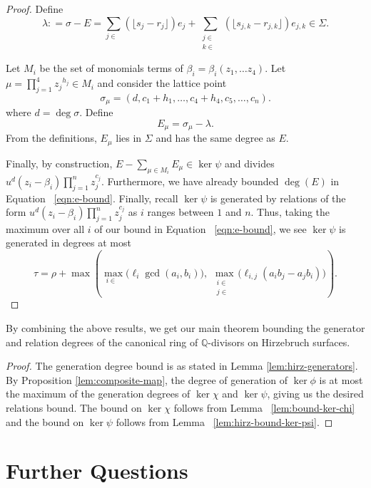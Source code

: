 \documentclass{amsart}
\theoremstyle{plain}
\theoremstyle{definition}
\theoremstyle{remark}
\numberwithin{equation}{section}
\newcommand\bq{{\mathbb Q}}
\newcommand\bida{a}
\newcommand\bidb{b}
\DeclareMathOperator{\Te}{T_=}
\DeclareMathOperator{\Tp}{T_+}
\DeclareMathOperator{\Tm}{T_-}
\begin{document}
\begin{proof}
Define
\begin{equation}\label{eqn:defn-lambda}
	\lambda \colon = \sigma - E = \sum_{j\in \Te} (\lfloor s_j - r_j\rfloor) e_j + \sum_{\substack{j\in \Tp \\ k\in \Tm}} ( \lfloor s_{j,k} - r_{j,k}\rfloor)e_{j,k}\in \Sigma.
 \end{equation}

Let $M_i$ be the set of monomials terms of $\beta_i = \beta_i(z_1, \ldots z_4)$.  Let $\mu = \prod_{j=1}^4
{z_j}^{h_j}\in M_i$ and consider the lattice point 
\[
	\sigma_\mu = (d, c_1 + h_1, \ldots, c_4+h_4, c_5, \ldots, c_n).
\]
where $d = \deg \sigma$.
Define 
\[
	E_\mu = \sigma_\mu - \lambda.
\]
From the definitions, $E_\mu$ lies in $\Sigma$ 
and has the same degree as $E$.

Finally, by construction, $E - \sum_{\mu \in M_i} E_\mu \in \ker \psi$ and
divides $u^d(z_i - \beta_i) \prod_{j = 1}^n z_j^{c_j}$. 
Furthermore, we have already bounded $\deg(E)$ in Equation ~\eqref{eqn:e-bound}.
Finally, recall $\ker \psi$ is generated by relations of the form $u^d(z_i - \beta_i) \prod_{j = 1}^n z_j^{c_j}$ as
$i$ ranges between $1$ and $n$. Thus, taking the maximum over all $i$ 
of our bound in Equation ~\eqref{eqn:e-bound}, we see $\ker \psi$ is generated in degrees at most
\[
	\tau = \rho
	+ \max \left(\max_{i\in \Te} \bigl(\ell_i \gcd(a_i, b_i) \bigr),
	\; \max_{\substack{i \in \Tp \\ j \in \Tm}} \bigl(\ell_{i, j}
	(\bida_i \bidb_j - \bida_j
	\bidb_i) \bigr) \right).
\]
\end{proof}

By combining the above results, we get our main theorem bounding
the generator and relation degrees of the canonical ring of
$\bq$-divisors on Hirzebruch surfaces.

\hirzrestate*

\begin{proof}
The generation degree bound is as stated in Lemma \ref{lem:hirz-generators}.
By Proposition \ref{lem:composite-map}, the degree of generation of
$\ker \phi$ is at most the maximum of the generation degrees of $\ker \chi$
and $\ker \psi$, giving us the desired relations bound. The bound on $\ker \chi$
follows from Lemma ~\ref{lem:bound-ker-chi} and the bound on $\ker \psi$
follows from Lemma ~\ref{lem:hirz-bound-ker-psi}.
\end{proof}


\section{Further Questions}
\label{sec:conc}
\end{document}
